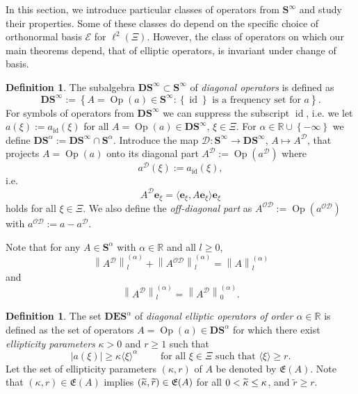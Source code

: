 \documentclass[10pt]{amsart}
\theoremstyle{definition}\newtheorem{defi}[theo]{Definition}\newtheorem{rema}[theo]{Remark}\newtheorem{exam}[theo]{Example}\newtheorem{nota}[theo]{Notation}
\DeclareMathOperator{\Op}{Op}
\DeclareMathOperator{\id}{id}
\newcommand{\R}{\mathbb R}
\newcommand{\CD}{\mathcal{D}}
\newcommand{\CE}{\mathcal{E}}
\newcommand{\CO}{\mathcal{O}}
\newcommand{\COD}{{\CO\CD}}
\newcommand{\BD}{\mathbf D}
\newcommand{\BE}{\mathbf E}
\newcommand{\BS}{\mathbf S}
\newcommand{\be}{\mathbf e}
\newcommand{\FE}{\mathfrak{E}}
\newcommand{\set}[1]{\left\{ #1 \right\}}
\newcommand{\snorm}[3]{\left\| #1\right\|_{#3}^{(#2)}}
\newcommand{\ang}[1]{\langle #1 \rangle}
\newcommand{\er}{r}
\let\oldtilde\tilde
\renewcommand*{\tilde}[1]{\mathchoice{\widetilde{#1}}{\widetilde{#1}}{\oldtilde{#1}}{\oldtilde{#1}}}
\begin{document}
In this section, we introduce particular classes of operators from $\BS^\infty$ and study their properties. Some of these classes do depend on the specific choice of orthonormal basis $\CE$ for $\ell^2(\Xi)$. However, the class of operators on which our main theorems depend, that of elliptic operators, is invariant under change of basis.

\begin{defi}\label{def:dapo}
The subalgebra $\BD\BS^\infty \subset \BS^\infty$ of \emph{diagonal operators} is defined as
\begin{equation}
\BD\BS^\infty := \set{A = \Op(a) \in \BS^\infty:\set{\id} \text{ is a frequency set for } a}.\label{eq:dapo}
\end{equation}
For symbols of operators from $\BD\BS^\infty$ we can suppress the subscript $\id$, i.e. we let $a(\xi) :=a_{\id}(\xi)$ for all $A =\Op(a)\in\BD\BS^\infty$, $\xi\in\Xi$. For $\alpha \in \R\cup \set{-\infty}$ we define $\BD\BS^\alpha := \BD\BS^\infty \cap \BS^\alpha$. Introduce the map $\CD : \BS^\infty \to \BD\BS^\infty$, $A\mapsto A^\CD$, that projects $A=\Op(a)$ onto its diagonal part $A^\CD:= \Op(a^\CD)$ where
\begin{equation}
a^\CD(\xi) := a_{\id}(\xi),
\end{equation}
i.e.
\begin{equation}
A^\CD\be_{\xi} =\langle\be_{\xi}, A\be_{\xi}\rangle \be_{\xi}
\end{equation}
holds for all $\xi \in\Xi$. We also define the \emph{off-diagonal part} as $A^{\CO\CD} := \Op(a^{\CO\CD})$ with $a^{\CO\CD}:=a-a^\CD$.
\end{defi}

Note that for any $A\in\BS^\alpha$ with $\alpha\in\R$ and all $l\geq 0$,
\begin{equation}\label{eq:partition}
\snorm{A^{\CD}}{\alpha}{l}+\snorm{A^{\COD}}{\alpha}{l}=\snorm{A}{\alpha}{l}
\end{equation}
and
\begin{equation}\label{eq:diagonal l irrelevant}
\snorm{A^\CD}{\alpha}{l} =\snorm{A^\CD}{\alpha}{0}.
\end{equation}

\begin{defi}\label{def:DES}
The set $\BD\BE\BS^\alpha$ of \emph{diagonal elliptic operators of order $\alpha\in\R$} is defined as the set of operators $A = \Op(a) \in \BD\BS^\alpha$ for which there exist \emph{ellipticity parameters} $\kappa> 0$ and $\er\ge 1$ such that
\begin{equation}\label{eq:ellconst}
|a(\xi)|\geq \kappa\ang{\xi}^\alpha \qquad \text{ for all $\xi\in\Xi$ such that }\ang{\xi}\geq
\er.
\end{equation}
Let the set of ellipticity parameters $(\kappa, \er)$ of $A$ be denoted by $\FE(A)$. Note that $(\kappa, \er)\in \FE(A)$ implies $(\tilde \kappa,\widetilde
\er)\in \FE(A)$ for all $0 <\tilde \kappa\leq \kappa$, and $\widetilde \er \geq \!
\er$.
\end{defi}
\end{document}
